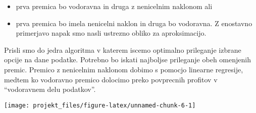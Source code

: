 \documentclass[
]{article}
\providecommand{\tightlist}{%
  \setlength{\itemsep}{0pt}\setlength{\parskip}{0pt}}
\begin{document}
\begin{itemize}
\tightlist
\item
  prva premica bo vodoravna in druga z nenicelnim naklonom ali
\item
  prva premica bo imela nenicelni naklon in druga bo vodoravna. Z
  enostavno primerjavo napak smo nasli ustrezno obliko za aproksimacijo.
\end{itemize}

Prisli smo do jedra algoritma v katerem iscemo optimalno prileganje
izbrane opcije na dane podatke. Potrebno bo iskati najboljse prileganje
obeh omenjenih premic. Premico z nenicelnim naklonom dobimo s pomocjo
linearne regresije, medtem ko vodoravno premico dolocimo preko
povprecnih profitov v ``vodoravnem delu podatkov''.

\begin{center}\texttt{[image: projekt\_files/figure-latex/unnamed-chunk-6-1]} \end{center}
\end{document}

